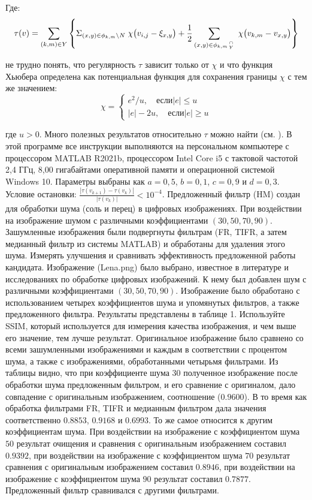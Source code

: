 \noindent Где:
\begin{equation*}
    \tau(v)=\sum_{(k,m)\in Y}\left\{\Sigma_{(x,y)\in\phi_{k,m}\backslash{N}}\;\chi\bigl(v_{i,j}-\xi_{x,y}\bigr)+\frac{1}{2}\sum_{(x,y)\in\phi_{k,m}\stackover{\cap}{Y}}\;\chi\bigl(v_{k,m}-v_{x,y}\bigr)\right\}
\end{equation*}

\noindent не трудно понять, что регулярность $\tau$ зависит только от $\chi$ и
что функция Хьюбера определена как потенциальная функция для сохранения границы
$\chi$ с тем же значением:
\begin{equation*}
    \chi = \begin{cases} 
        e^{2}/u, \quad \text{если} |e|\leq u \\ 
        |e|-2u, \quad \text{если} |e| \ge u
    \end{cases}
\end{equation*}

\noindent где $u > 0$. Много полезных результатов относительно $\tau$ можно найти (см.
\cite{art24,art25,art26}). В этой программе все инструкции выполняются на персональном
компьютере с процессором MATLAB R2021b, процессором Intel Core i5 с тактовой
частотой 2,4 ГГц, 8,00 гигабайтами оперативной памяти и операционной системой
Windows 10. Параметры выбраны как $a = 0,5$, $b = 0,1$, $c = 0,9$ и $d = 0,3$.
Условие остановки:
${\frac{|\tau(v_{k+1})-\tau(v_{k})|}{|\tau(v_{k})|}}<10^{-4}$. Предложенный
фильтр (HM) создан для обработки шума (соль и перец) в цифровых изображениях.
При воздействии на изображение шумом с различными коэффициентами
$\left(30,50,70,90\right)$. Зашумленные изображения были подвергнуты фильтрам
(FR, TIFR, а затем медианный фильтр из системы MATLAB) и обработаны для удаления
этого шума. Измерять улучшения и сравнивать эффективность предложенной работы
кандидата. Изображение (Lena.png) было выбрано, известное в литературе и
исследованиях по обработке цифровых изображений. К нему был добавлен шум с
различными коэффициентами $\left(30,50,70,90\right)$. Изображение было
обработано с использованием четырех коэффициентов шума и упомянутых фильтров, а
также предложенного фильтра. Результаты представлены в таблице 1. Используйте
SSIM, который используется для измерения качества изображения, и чем выше его
значение, тем лучше результат. Оригинальное изображение было сравнено со всеми
зашумленными изображениями и каждым в соответствии с процентом шума, а также с
изображениями, обработанными четырьмя фильтрами. Из таблицы видно, что при
коэффициенте шума 30 полученное изображение после обработки шума предложенным
фильтром, и его сравнение с оригиналом, дало совпадение с оригинальным
изображением, соотношение ($0.9600$). В то время как обработка фильтрами FR,
TIFR и медианным фильтром дала значения соответственно $0.8853$, $0.9168$ и
$0.6993$. То же самое относится к другим коэффициентам шума. При воздействии на
изображение с коэффициентом шума $50$ результат очищения и сравнения с
оригинальным изображением составил $0.9392$, при воздействии на изображение с
коэффициентом шума $70$ результат сравнения с оригинальным изображением составил
$0.8946$, при воздействии на изображение с коэффициентом шума $90$ результат
составил $0.7877$. Предложенный фильтр сравнивался с другими фильтрами.

